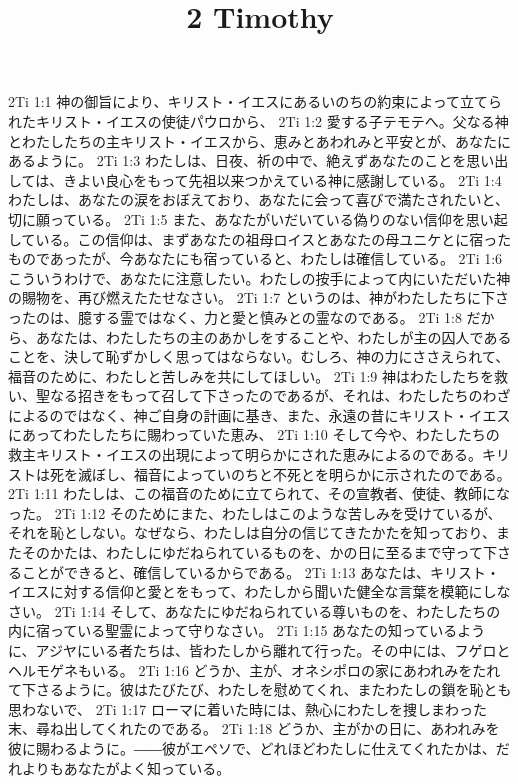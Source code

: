 

\title{2 Timothy}

2Ti 1:1  神の御旨により、キリスト・イエスにあるいのちの約束によって立てられたキリスト・イエスの使徒パウロから、
2Ti 1:2  愛する子テモテへ。父なる神とわたしたちの主キリスト・イエスから、恵みとあわれみと平安とが、あなたにあるように。
2Ti 1:3  わたしは、日夜、祈の中で、絶えずあなたのことを思い出しては、きよい良心をもって先祖以来つかえている神に感謝している。
2Ti 1:4  わたしは、あなたの涙をおぼえており、あなたに会って喜びで満たされたいと、切に願っている。
2Ti 1:5  また、あなたがいだいている偽りのない信仰を思い起している。この信仰は、まずあなたの祖母ロイスとあなたの母ユニケとに宿ったものであったが、今あなたにも宿っていると、わたしは確信している。
2Ti 1:6  こういうわけで、あなたに注意したい。わたしの按手によって内にいただいた神の賜物を、再び燃えたたせなさい。
2Ti 1:7  というのは、神がわたしたちに下さったのは、臆する霊ではなく、力と愛と慎みとの霊なのである。
2Ti 1:8  だから、あなたは、わたしたちの主のあかしをすることや、わたしが主の囚人であることを、決して恥ずかしく思ってはならない。むしろ、神の力にささえられて、福音のために、わたしと苦しみを共にしてほしい。
2Ti 1:9  神はわたしたちを救い、聖なる招きをもって召して下さったのであるが、それは、わたしたちのわざによるのではなく、神ご自身の計画に基き、また、永遠の昔にキリスト・イエスにあってわたしたちに賜わっていた恵み、
2Ti 1:10  そして今や、わたしたちの救主キリスト・イエスの出現によって明らかにされた恵みによるのである。キリストは死を滅ぼし、福音によっていのちと不死とを明らかに示されたのである。
2Ti 1:11  わたしは、この福音のために立てられて、その宣教者、使徒、教師になった。
2Ti 1:12  そのためにまた、わたしはこのような苦しみを受けているが、それを恥としない。なぜなら、わたしは自分の信じてきたかたを知っており、またそのかたは、わたしにゆだねられているものを、かの日に至るまで守って下さることができると、確信しているからである。
2Ti 1:13  あなたは、キリスト・イエスに対する信仰と愛とをもって、わたしから聞いた健全な言葉を模範にしなさい。
2Ti 1:14  そして、あなたにゆだねられている尊いものを、わたしたちの内に宿っている聖霊によって守りなさい。
2Ti 1:15  あなたの知っているように、アジヤにいる者たちは、皆わたしから離れて行った。その中には、フゲロとヘルモゲネもいる。
2Ti 1:16  どうか、主が、オネシポロの家にあわれみをたれて下さるように。彼はたびたび、わたしを慰めてくれ、またわたしの鎖を恥とも思わないで、
2Ti 1:17  ローマに着いた時には、熱心にわたしを捜しまわった末、尋ね出してくれたのである。
2Ti 1:18  どうか、主がかの日に、あわれみを彼に賜わるように。――彼がエペソで、どれほどわたしに仕えてくれたかは、だれよりもあなたがよく知っている。
